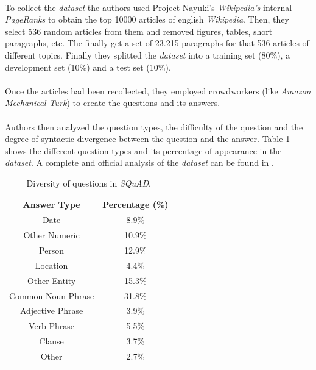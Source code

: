 \paragraph{}
To collect the \emph{dataset} the authors used Project Nayuki's \emph{Wikipedia's} internal \emph{PageRanks} to obtain the top 10000 articles of english \emph{Wikipedia}. Then, they select 536 random articles from them and removed figures, tables, short paragraphs, etc. The finally get a set of 23.215 paragraphs for that 536 articles of different topics. Finally they splitted the \emph{dataset} into a training set (80\%), a development set (10\%) and a test set (10\%).
\paragraph{}
Once the articles had been recollected, they employed crowdworkers (like \emph{Amazon Mechanical Turk}) to create the questions and its answers. 
\paragraph{}
Authors then analyzed the question types, the difficulty of the question and the degree of syntactic divergence between the question and the answer. Table \ref{tab:squad-types} shows the different question types and its percentage of appearance in the \emph{dataset}. A complete and official analysis of the \emph{dataset} can be found in \cite{Rajpurkar2016}.
\begin{table}[!h]
	\centering
	\begin{tabular}{|c|c|}
	\hline 
	Answer Type & Percentage (\%) \\ 
	\hline 
	Date  & 8.9\% \\ 
	\hline 
	Other Numeric & 10.9\% \\ 
	\hline 
	Person & 12.9\% \\ 
	\hline 
	Location & 4.4\% \\ 
	\hline 
	Other Entity & 15.3\% \\ 
	\hline 
	Common Noun Phrase & 31.8\% \\ 
	\hline 
	Adjective Phrase & 3.9\% \\ 
	\hline 
	Verb Phrase & 5.5\% \\ 
	\hline 
	Clause & 3.7\% \\ 
	\hline 
	Other & 2.7\% \\ 
	\hline 
	\end{tabular} 
	\caption{Diversity of questions in \emph{SQuAD}.}
	\label{tab:squad-types}
\end{table}
